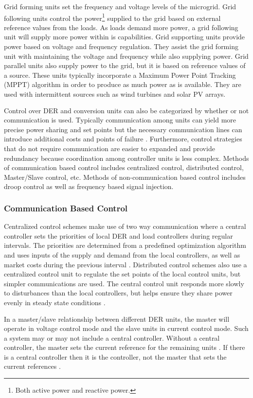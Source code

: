 Grid forming units set the frequency and voltage levels of the microgrid. Grid following units control the power\footnote{Both active power and reactive power.} supplied to the grid based on external reference values from the loads. As loads demand more power, a grid following unit will supply more power within is capabilities. Grid supporting units provide power based on voltage and frequency regulation. They assist the grid forming unit with maintaining the voltage and frequency while also supplying power. Grid parallel units also supply power to the grid, but it is based on reference values of a source. These units typically incorporate a Maximum Power Point Tracking (MPPT) algorithm in order to produce as much power as is available. They are used with intermittent sources such as wind turbines and solar PV arrays. 

Control over DER and conversion units can also be categorized by whether or not communication is used. Typically communication among units can yield more precise power sharing and set points but the necessary communication lines can introduce additional costs and points of failure \cite{Vandoorn2013}. Furthermore, control strategies that do not require communication are easier to expanded and provide redundancy because coordination among controller units is less complex. Methods of communication based control includes centralized control, distributed control, Master\slash Slave control, etc. Methods of non-communication based control includes droop control as well as frequency based signal injection.

\subsubsection{Communication Based Control}
Centralized control schemes make use of two way communication where a central controller sets the priorities of local DER and load controllers during regular intervals. The priorities are determined from a predefined optimization algorithm and uses inputs of the supply and demand from the local controllers, as well as market costs during the previous interval \cite{Katiraei2008}. Distributed control schemes also use a centralized control unit to regulate the set points of the local control units, but simpler communications are used. The central control unit responds more slowly to disturbances than the local controllers, but helps ensure they share power evenly in steady state conditions \cite{Prodanovic2006}. 

In a master\slash slave relationship between different DER units, the master will operate in voltage control mode and the slave units in current control mode. Such a system may or may not include a central controller. Without a central controller, the master sets the current reference for the remaining units \cite{Siri1992}. If there is a central controller then it is the controller, not the master that sets the current references \cite{Chen1995}.

